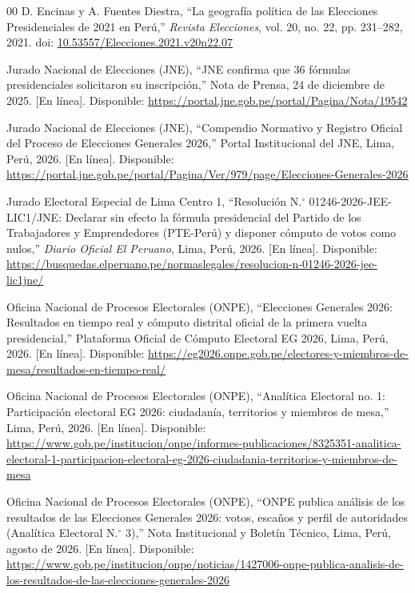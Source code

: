 \documentclass[conference,10pt,letterpaper]{IEEEtran}
\begin{document}
\begin{thebibliography}{00}
 D. Encinas y A. Fuentes Diestra, ``La geografía política de las Elecciones Presidenciales de 2021 en Perú,'' \textit{Revista Elecciones}, vol. 20, no. 22, pp. 231--282, 2021. doi: \href{https://doi.org/10.53557/Elecciones.2021.v20n22.07}{10.53557/Elecciones.2021.v20n22.07}

 Jurado Nacional de Elecciones (JNE), ``JNE confirma que 36 fórmulas presidenciales solicitaron su inscripción,'' Nota de Prensa, 24 de diciembre de 2025. [En línea]. Disponible: \url{https://portal.jne.gob.pe/portal/Pagina/Nota/19542}

 Jurado Nacional de Elecciones (JNE), ``Compendio Normativo y Registro Oficial del Proceso de Elecciones Generales 2026,'' Portal Institucional del JNE, Lima, Perú, 2026. [En línea]. Disponible: \url{https://portal.jne.gob.pe/portal/Pagina/Ver/979/page/Elecciones-Generales-2026}

 Jurado Electoral Especial de Lima Centro 1, ``Resolución N.$^\circ$ 01246-2026-JEE-LIC1/JNE: Declarar sin efecto la fórmula presidencial del Partido de los Trabajadores y Emprendedores (PTE-Perú) y disponer cómputo de votos como nulos,'' \textit{Diario Oficial El Peruano}, Lima, Perú, 2026. [En línea]. Disponible: \url{https://busquedas.elperuano.pe/normaslegales/resolucion-n-01246-2026-jee-lic1jne/}

 Oficina Nacional de Procesos Electorales (ONPE), ``Elecciones Generales 2026: Resultados en tiempo real y cómputo distrital oficial de la primera vuelta presidencial,'' Plataforma Oficial de Cómputo Electoral EG 2026, Lima, Perú, 2026. [En línea]. Disponible: \url{https://eg2026.onpe.gob.pe/electores-y-miembros-de-mesa/resultados-en-tiempo-real/}

 Oficina Nacional de Procesos Electorales (ONPE), ``Analítica Electoral no. 1: Participación electoral EG 2026: ciudadanía, territorios y miembros de mesa,'' Lima, Perú, 2026. [En línea]. Disponible: \url{https://www.gob.pe/institucion/onpe/informes-publicaciones/8325351-analitica-electoral-1-participacion-electoral-eg-2026-ciudadania-territorios-y-miembros-de-mesa}

 Oficina Nacional de Procesos Electorales (ONPE), ``ONPE publica análisis de los resultados de las Elecciones Generales 2026: votos, escaños y perfil de autoridades (Analítica Electoral N.$^\circ$ 3),'' Nota Institucional y Boletín Técnico, Lima, Perú, agosto de 2026. [En línea]. Disponible: \url{https://www.gob.pe/institucion/onpe/noticias/1427006-onpe-publica-analisis-de-los-resultados-de-las-elecciones-generales-2026}


\end{thebibliography}
\end{document}
